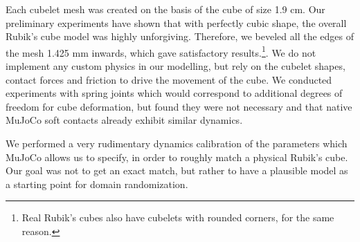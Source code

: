 Each cubelet mesh was created on the basis of the cube of size 1.9 cm. Our preliminary experiments have shown that with perfectly cubic shape, the overall Rubik's cube model was highly unforgiving. Therefore, we beveled all the edges of the mesh 1.425 mm inwards, which gave satisfactory results.\footnote{Real Rubik's cubes also have cubelets with rounded corners, for the same reason.}. We do not implement any custom physics in our modelling, but rely on the cubelet shapes, contact forces and friction to drive the movement of the cube. We conducted experiments with spring joints which would correspond to additional degrees of freedom for cube deformation, but found they were not necessary and that native MuJoCo soft contacts already exhibit similar dynamics.

We performed a very rudimentary dynamics calibration of the parameters which MuJoCo allows us to specify, in order to roughly match a physical Rubik's cube. Our goal was not to get an exact match, but rather to have a plausible model as a starting point for domain randomization.

